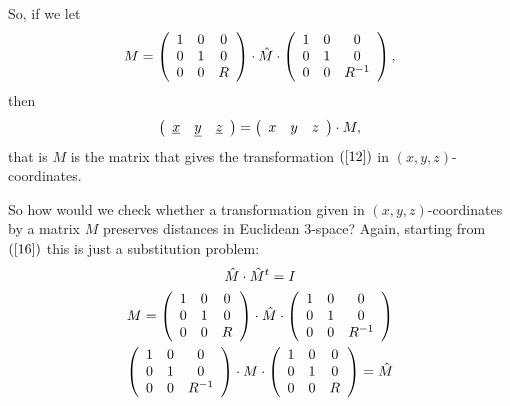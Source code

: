 \documentclass{article}%
\begin{document}
So, if we let%
\[
M=\left(
\begin{array}
[c]{ccc}%
1 & 0 & 0\\
0 & 1 & 0\\
0 & 0 & R
\end{array}
\right)  \cdot\hat{M}\cdot\left(
\begin{array}
[c]{ccc}%
1 & 0 & 0\\
0 & 1 & 0\\
0 & 0 & R^{-1}%
\end{array}
\right)  ,
\]
then%
\begin{equation}
\left(
\begin{array}
[c]{ccc}%
\underline{x} & \underline{y} & \underline{z}%
\end{array}
\right)  =\left(
\begin{array}
[c]{ccc}%
x & y & z
\end{array}
\right)  \cdot M, \label{15}%
\end{equation}
that is $M$ is the matrix that gives the transformation $\left(
\ref{12}\right)  $ in $\left(  x,y,z\right)  $-coordinates.

So how would we check whether a transformation given in $\left(  x,y,z\right)
$-coordinates by a matrix $M$ preserves distances in Euclidean $3$-space?
Again, starting from $\left(  \ref{16}\right)  $ this is just a substitution
problem:%
\begin{gather*}
\hat{M}\cdot\hat{M}^{t}=I\\
M=\left(
\begin{array}
[c]{ccc}%
1 & 0 & 0\\
0 & 1 & 0\\
0 & 0 & R
\end{array}
\right)  \cdot\hat{M}\cdot\left(
\begin{array}
[c]{ccc}%
1 & 0 & 0\\
0 & 1 & 0\\
0 & 0 & R^{-1}%
\end{array}
\right) \\
\left(
\begin{array}
[c]{ccc}%
1 & 0 & 0\\
0 & 1 & 0\\
0 & 0 & R^{-1}%
\end{array}
\right)  \cdot M\cdot\left(
\begin{array}
[c]{ccc}%
1 & 0 & 0\\
0 & 1 & 0\\
0 & 0 & R
\end{array}
\right)  =\hat{M}%
\end{gather*}
\end{document}
